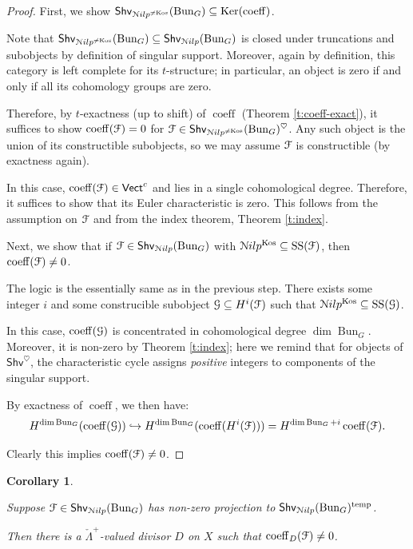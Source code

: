 \documentclass[reqno,11pt]{amsart}
\numberwithin{equation}{subsection}
\newtheorem{cor}[thm]{Corollary}
\theoremstyle{remark}
\newcommand{\into}{\hookrightarrow}
\newcommand{\sF}{{\EuScript F}}
\newcommand{\sG}{{\EuScript G}}
\newcommand{\sN}{{\EuScript N}}
\newcommand{\on}{\operatorname}
\newcommand{\Ker}{\on{Ker}}
\newcommand{\Vect}{\mathsf{Vect}}
\newcommand{\Bun}{\on{Bun}}
\newcommand{\heart}{\heartsuit}
\renewcommand{\subset}{\subseteq}
\newcommand{\coeff}{\on{coeff}}
\newcommand{\Shv}{\mathsf{Shv}}
\newcommand{\temp}{\on{temp}}
\newcommand{\Nilp}{\sN ilp}
\newcommand{\Kos}{\on{Kos}}
\renewcommand{\SS}{\on{SS}}
\begin{document}
\begin{proof}

\step 

First, we show $\Shv_{\Nilp^{\neq \Kos}}(\Bun_G) \subset \Ker(\coeff)$.

Note that $\Shv_{\Nilp^{\neq \Kos}}(\Bun_G) \subset \Shv_{\Nilp}(\Bun_G)$
is closed under truncations and subobjects by definition of singular
support. Moreover, again by definition, this category is left complete
for its $t$-structure; in particular, an object is zero if and only
if all its cohomology groups are zero.

Therefore, by $t$-exactness (up to shift) of $\coeff$ (Theorem \ref{t:coeff-exact}),
it suffices to show $\coeff(\sF) = 0$ for 
$\sF \in \Shv_{\Nilp^{\neq \Kos}}(\Bun_G)^{\heart}$.
Any such object is the union of its constructible subobjects, so 
we may assume $\sF$ is constructible (by exactness again).

In this case, $\coeff(\sF) \in \Vect^c$ and lies in a single
cohomological degree. Therefore, it suffices to show that its
Euler characteristic is zero. This follows from the assumption 
on $\sF$ and from the index
theorem, Theorem \ref{t:index}. 

\step 

Next, we show that if $\sF \in \Shv_{\Nilp}(\Bun_G)$ with 
$\Nilp^{\Kos} \subset \SS(\sF)$,
then $\coeff(\sF) \neq 0$.

The logic is the essentially same as in the previous step.
There exists some integer $i$ and some construcible subobject
$\sG \subset H^i(\sF)$ such that $\Nilp^{\Kos} \subset \SS(\sG)$.

In this case, $\coeff(\sG)$ is concentrated in cohomological
degree $\dim \Bun_G$. Moreover, it is non-zero 
by Theorem \ref{t:index}; here we remind that for objects 
of $\Shv^{\heart}$, the characteristic
cycle assigns \emph{positive} integers to components of the singular support.

By exactness of $\coeff$, we then have:
%
\[
H^{\dim \Bun_G}(\coeff(\sG)) \into H^{\dim \Bun_G}(\coeff(H^i(\sF))) = 
H^{\dim \Bun_G+i}\coeff(\sF).
\]

\noindent Clearly this implies $\coeff(\sF) \neq 0$.

\end{proof}

\begin{cor}\label{c:main-nilp}

Suppose $\sF \in \Shv_{\Nilp}(\Bun_G)$ has non-zero projection
to $\Shv_{\Nilp}(\Bun_G)^{\temp}$. 

Then there is a $\check{\Lambda}^+$-valued
divisor $D$ on $X$ such that $\coeff_D(\sF) \neq 0$.

\end{cor}
\end{document}
